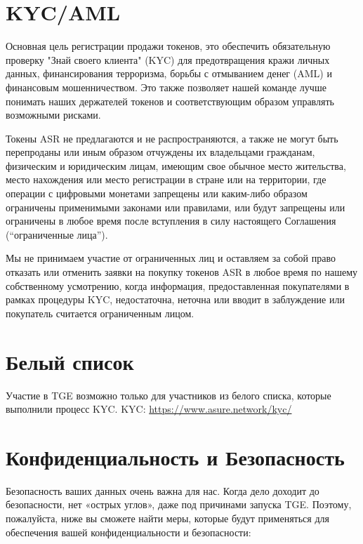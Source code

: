 \newpage 

\section{KYC/AML}

Основная цель регистрации продажи токенов, это обеспечить обязательную проверку "Знай своего клиента" (KYC) для предотвращения кражи личных данных, финансирования терроризма, борьбы с отмыванием денег (AML) и финансовым мошенничеством. Это также позволяет нашей команде лучше понимать наших держателей токенов и соответствующим образом управлять возможными рисками.

Токены ASR не предлагаются и не распространяются, а также не могут быть перепроданы или иным образом отчуждены их владельцами гражданам, физическим и юридическим лицам, имеющим свое обычное место жительства, место нахождения или место регистрации в стране или на территории, где операции с цифровыми монетами запрещены или каким-либо образом ограничены применимыми законами или правилами, или будут запрещены или ограничены в любое время после вступления в силу настоящего Соглашения (“ограниченные лица”).

Мы не принимаем участие от ограниченных лиц и оставляем за собой право отказать или отменить заявки на покупку токенов ASR в любое время по нашему собственному усмотрению, когда информация, предоставленная покупателями в рамках процедуры KYC, недостаточна, неточна или вводит в заблуждение или покупатель считается ограниченным лицом.

\section{Белый список}

Участие в TGE возможно только для участников из белого списка, которые выполнили процесс KYC.
\newline\newline
KYC: \url{https://www.asure.network/kyc/}

\section{Конфиденциальность и Безопасность}
Безопасность ваших данных очень важна для нас. Когда дело доходит до безопасности, нет «острых углов», даже под причинами запуска TGE. Поэтому, пожалуйста, ниже вы сможете найти меры, которые будут применяться для обеспечения вашей конфиденциальности и безопасности:


